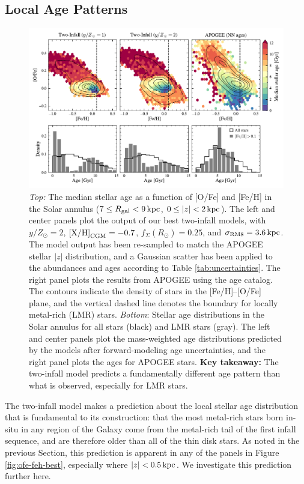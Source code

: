 \documentclass[twocolumn,twocolappendix,linenumbers]{aastex631}
\newcommand{\yZ}[1]{$y/Z_\odot=#1$}
\newcommand{\kpc}{\,{\rm kpc}}
\begin{document}
\subsection{Local Age Patterns}

\begin{figure}
    \centering
    \includegraphics[width=\linewidth]{figures/lmr_ages.pdf}
    \caption{{\it Top:} The median stellar age as a function of [O/Fe] and [Fe/H] in the Solar annulus ($7\leq R_{\rm gal}<9\kpc$, $0\leq|z|<2\kpc$). The left and center panels plot the output of our best two-infall models, with \yZ{2}, ${\rm [X/H]}_{\rm CGM}=-0.7$, $f_\Sigma(R_\odot)=0.25$, and $\sigma_{\rm RM8}=3.6\kpc$. The model output has been re-sampled to match the APOGEE stellar $|z|$ distribution, and a Gaussian scatter has been applied to the abundances and ages according to Table \ref{tab:uncertainties}. The right panel plots the results from APOGEE using the \citet{leung_variational_2023} age catalog. The contours indicate the density of stars in the [Fe/H]--[O/Fe] plane, and the vertical dashed line denotes the boundary for locally metal-rich (LMR) stars.
    {\it Bottom}: Stellar age distributions in the Solar annulus for all stars (black) and LMR stars (gray). The left and center panels plot the mass-weighted age distributions predicted by the models after forward-modeling age uncertainties, and the right panel plots the \citet{leung_variational_2023} ages for APOGEE stars.
    {\bf Key takeaway:} The two-infall model predicts a fundamentally different age pattern than what is observed, especially for LMR stars.}
    \label{fig:lmr-ages}
\end{figure}

The two-infall model makes a prediction about the local stellar age distribution that is fundamental to its construction: that the most metal-rich stars born in-situ in any region of the Galaxy come from the metal-rich tail of the first infall sequence, and are therefore older than all of the thin disk stars. As noted in the previous Section, this prediction is apparent in any of the panels in Figure \ref{fig:ofe-feh-best}, especially where $|z|<0.5\kpc$. We investigate this prediction further here.
\end{document}

